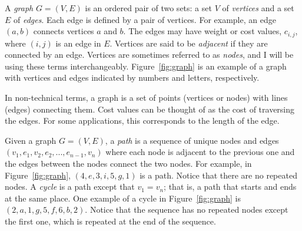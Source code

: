 \documentclass{sig-alternate}
\begin{document}
A \textit{graph} $G=(V,E)$ is an ordered pair of two sets: a set $V$ of \textit{vertices} and a set $E$ of \textit{edges}. Each edge is defined by a pair of vertices. For example, an edge $(a,b)$ connects vertices $a$ and $b$. The edges may have weight or cost values, $c_{i,j}$, where $(i,j)$ is an edge in $E$. Vertices are said to be \textit{adjacent} if they are connected by an edge. Vertices are sometimes referred to as \textit{nodes}, and I will be using these terms interchangeably. Figure~\ref{fig:graph} is an example of a graph with vertices and edges indicated by numbers and letters, respectively. 

In non-technical terms, a graph is a set of points (vertices or nodes) with lines (edges) connecting them. Cost values can be thought of as the cost of traversing the edges. For some applications, this corresponds to the length of the edge. 

Given a graph $G=(V,E)$, a \textit{path} is a sequence of unique nodes and edges $(v_{1}, e_{1}, v_{2}, e_{2}, ..., e_{n-1}, v_{n})$ where each node is adjacent to the previous one and the edges between the nodes connect the two nodes. For example, in Figure~\ref{fig:graph}, $(4,e,3,i,5,g,1)$ is a path. Notice that there are no repeated nodes. A \textit{cycle} is a path except that $v_{1} = v_{n}$; that is, a path that starts and ends at the same place. One example of a cycle in Figure~\ref{fig:graph} is $(2,a,1,g,5,f,6,b,2)$. Notice that the sequence has no repeated nodes except the first one, which is repeated at the end of the sequence. 


\end{document}
